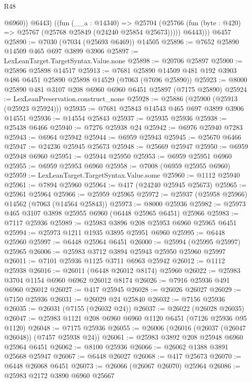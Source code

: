 \begin{lexlean}{R48}
\begin{coremodule}
            @6960))
          @6443)
        ((fun (__a : @14340) =>
        @25704 (@25766 (fun (byte : @420) => @25767 (@25768 @25849 (@24240 @25854 @25673)))))
          @6443)))
    @6457
@25890 := @7030 (@7034 (@25693 @6469)) @14505
@25896 := @7652 @25890 @14509 @465 @697 @3899 @3906
@25897 := LexLeanTarget.TargetSyntax.Value.none
@25898 := @20706 @25897
@25900 := @25896 @25898 @14517
@25913 := @7681 @25890 @14509 @481 @192 @3903 @486 @6451 @25890 @25898 @14529 (@7063 (@7696 @25890))
@25923 := @8000 @25890 @481 @3107 @208 @6960 @6960 @6451 @25897 (@7175 @25890)
@25924 := LexLeanPreservation.construct_none
@25928 := @25886 (@25900 (@25913 (@25923 @25924)))
@25935 := @7681 @25843 @14543 @465 @697 @3899 @3906 @14551
@25936 := @14554 @25843
@25937 := @25935 @25936
@25938 := @25438 @6466
@25940 := @7276 @25938 @24
@25942 := @6976 @25940 @7283
@25943 := @6964 @25942
@25944 := @6959 @25943
@25945 := @25670 @6466
@25947 := @24236 @25945 @25673
@25948 := @25669 @25947
@25950 := @6959 @25948 @6960
@25951 := @25944 @25950
@25953 := @6959 @25951 @6960
@25955 := @6959 @25953 @6960
@25958 := @7008 (@6959 @25955 @6960)
@25959 := LexLeanTarget.TargetSyntax.Value.some
@25960 := @1112 @25940
@25961 := @7894 @25960
@25964 := @417 (@24240 @25945 @25673)
@25965 := @25961 @25964
@25966 := @25959 @25965
@25972 := @25937 (@25958 @25966) @14562 (@7063 (@14564 @25843))
@25973 := @8000 @25936
@25982 := @25973 @465 @3107 @3898 @25955 @6960 (@6448 @25965 @6451) @25966
@25983 := @7117 @25936
@25989 := @25983 @3896 @208 @25953 @6960 @25965 @6451
@25994 := @25973 @1211 @1935 @3895 @25951 @6960
@25995 := @6448 @25960
@25997 := @6448 @25964 @6451
@26000 := @25994 (@25995 @25997) @25965
@26006 := @25983 @3712 @3894 @25943 @25950 @25960 @25997
@26011 := @7101 @25936 @1125 @3711 @6963 @25942
@26012 := @1112 @25938
@26016 := @26011 (@6448 @26012 @8174) @25960
@26022 := @25983 @3704 @1154 @6960 @6962 @26012 @8174
@26026 := @7916 @25936 @491 @6960 @26012
@26027 := @417 @25945
@26028 := @26026 @26027
@26029 := @7150 @25936
@26031 := @26029 @24 @25840
@26032 := @7156 @25936
@26035 := @26031 (@7155 (@26032 @24))
@26037 := @26022 (@26028 @26035)
@26047 := @25983 @1121 @208 @6960 @6960 @1120 @6451 (@7126 @25936 @95 @1120)
@26048 := @7175 @25936
@26055 := @26006 (@26016 (@26037 (@26047 @26048)) (@7457 @25938 @24))
@26061 := @25983 @3892 @208 @25948 @6960 @25964 @6451
@26062 := @8100 @25936
@26066 := @26062 @1388 @3891 @25668 @25947
@26067 := @6448 @26027
@26068 := @417 @25673
@26070 := @6448 @26068 @6451
@26073 := @26066 (@26067 @26070) @25964
@26086 := @25983
    @2172
    @3890
    @6960
    @25667

\end{coremodule}
\end{lexlean}
